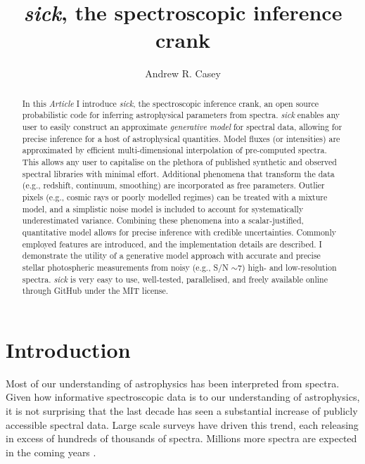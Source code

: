 \documentclass{aastex}
\newcommand{\sick}{\textit{sick}}
\newcommand{\article}{\textit{Article}}
\begin{document}
\title{\sick, the spectroscopic inference crank}

\author{Andrew R. Casey}


\begin{abstract}
In this \article{}  I  introduce \sick{}, the spectroscopic inference crank, an 
open source probabilistic code for inferring astrophysical parameters from 
spectra. \sick{} enables any user to easily construct an approximate 
\textit{generative model} for spectral data, allowing for precise inference for 
a host of astrophysical quantities. Model fluxes (or intensities) are approximated 
by efficient multi-dimensional interpolation of pre-computed spectra. This allows 
any user to capitalise on the plethora of published synthetic and observed spectral 
libraries with minimal effort. Additional phenomena that transform the data 
(e.g., redshift, continuum, smoothing) are incorporated as free parameters. 
Outlier pixels (e.g., cosmic rays or poorly modelled regimes) can be treated with 
a mixture model, and a simplistic noise model is included to account for 
systematically underestimated variance. Combining these phenomena into a 
scalar-justified, quantitative model allows for precise inference with credible 
uncertainties. Commonly employed features are introduced, and the implementation 
details are described. I demonstrate the utility of a generative model approach 
with accurate and precise stellar photospheric measurements from noisy (e.g., 
S/N $\sim{} 7$) high- and low-resolution spectra. \sick{} is very easy to use, 
well-tested, parallelised, and freely available online through GitHub under the 
MIT license. 
\end{abstract}

\section{Introduction}
Most of our understanding of astrophysics has been interpreted from spectra. 
Given how informative spectroscopic data is to our understanding of astrophysics, 
it is not surprising that the last decade has seen a substantial increase of 
publicly accessible spectral data. Large scale surveys have driven this trend, 
each releasing in excess of hundreds of thousands \citep[e.g.,][]{wigglez,boss,
segue,rave,gaia-eso} of spectra. Millions more spectra are expected in the 
coming years \citep[e.g.,][]{lamost,galah}.
 
\end{document}

